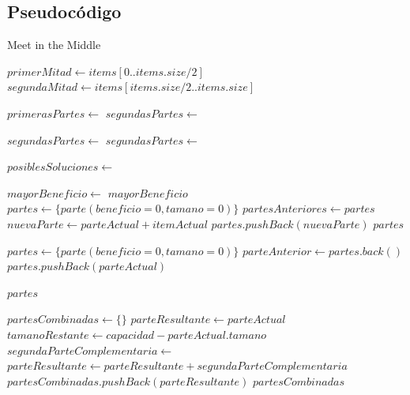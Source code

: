 \documentclass[10pt, a4paper]{article}
\begin{document}
\subsection{Pseudocódigo}
\begin{algorithm}
\caption{Meet in the Middle}
\begin{algorithmic}[1]
	\State $primerMitad \gets items[0..items.size / 2]$
	\State $segundaMitad \gets items[items.size / 2..items.size]$

	\State $primerasPartes \gets $ 
	\State $segundasPartes \gets $ 

	\State $segundasPartes \gets $ 
	\State $segundasPartes \gets $ 

	\State $posiblesSoluciones \gets $ 

	\State $mayorBeneficio \gets $ 
	\State \Return $mayorBeneficio$
\EndFunction
\\
	\State $partes \gets \{parte(beneficio=0, tamano=0)\}$
		\State $partesAnteriores \gets partes$
			\State $nuevaParte \gets parteActual + itemActual$
				\State $partes.pushBack(nuevaParte)$
			\EndIf
		\EndFor
	\EndFor
	\State \Return $partes$
\EndFunction
\\

	\State $partes \gets \{parte(beneficio=0, tamano=0)\}$
		\State $parteAnterior \gets partes.back()$
			\State $partes.pushBack(parteActual)$
		\EndIf
	\EndFor

	\State \Return $partes$
\EndFunction
{}
\end{algorithmic}
\end{algorithm}

\begin{algorithm}
\begin{algorithmic}[1]

	\State $partesCombinadas \gets \{\}$
		\State $parteResultante \gets parteActual$
		\State $tamanoRestante \gets capacidad - parteActual.tamano$
		\State $segundaParteComplementaria \gets$
			\State $parteResultante \gets parteResultante + segundaParteComplementaria$
		\EndIf
		\State $partesCombinadas.pushBack(parteResultante)$
	\EndFor
	\State \Return $partesCombinadas$
\EndFunction
\end{algorithmic}
\end{algorithm}
\pagebreak
\end{document}

